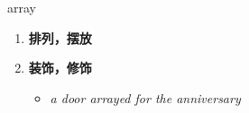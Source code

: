 
\begin{frame}
{\huge array}
\begin{center}
\begin{enumerate}\Large
  \item \textbf{排列，摆放}
  \item \textbf{装饰，修饰}
  \begin{itemize}
    \item \em{\Large{a door arrayed for the anniversary}}
  \end{itemize}
\end{enumerate}
\end{center}
\end{frame}
